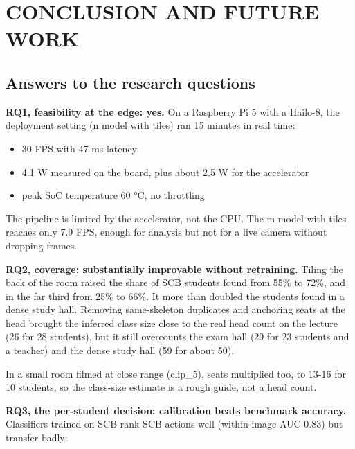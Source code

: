 \chapter{CONCLUSION AND FUTURE WORK}

\section{Answers to the research questions}

\textbf{RQ1, feasibility at the edge: yes.} On a Raspberry Pi 5 with a Hailo-8, the deployment setting (n model with tiles) ran 15 minutes in real time:

\begin{itemize}
\tightlist
\item
  30 FPS with 47 ms latency
\item
  4.1 W measured on the board, plus about 2.5 W for the accelerator
\item
  peak SoC temperature 60 °C, no throttling
\end{itemize}

The pipeline is limited by the accelerator, not the CPU. The m model with tiles reaches only 7.9 FPS, enough for analysis but not for a live camera without dropping frames.

\textbf{RQ2, coverage: substantially improvable without retraining.} Tiling the back of the room raised the share of SCB students found from 55\% to 72\%, and in the far third from 25\% to 66\%. It more than doubled the students found in a dense study hall. Removing same-skeleton duplicates and anchoring seats at the head brought the inferred class size close to the real head count on the lecture (26 for 28 students), but it still overcounts the exam hall (29 for 23 students and a teacher) and the dense study hall (59 for about 50).

In a small room filmed at close range (clip\_5), seats multiplied too, to 13-16 for 10 students, so the class-size estimate is a rough guide, not a head count.

\textbf{RQ3, the per-student decision: calibration beats benchmark accuracy.} Classifiers trained on SCB rank SCB actions well (within-image AUC 0.83) but transfer badly:

